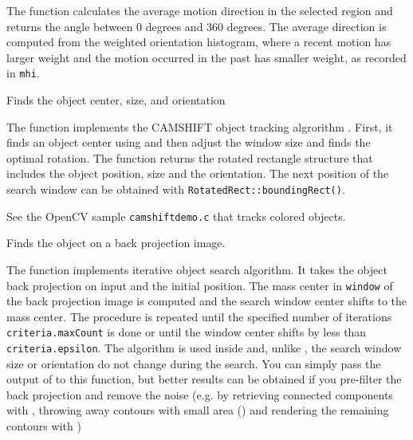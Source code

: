 The function calculates the average
motion direction in the selected region and returns the angle between
0 degrees  and 360 degrees. The average direction is computed from
the weighted orientation histogram, where a recent motion has larger
weight and the motion occurred in the past has smaller weight, as recorded in \texttt{mhi}.

Finds the object center, size, and orientation

\begin{description}
\end{description}

The function implements the CAMSHIFT object tracking algrorithm
.
First, it finds an object center using  and then adjust the window size and finds the optimal rotation. The function returns the rotated rectangle structure that includes the object position, size and the orientation. The next position of the search window can be obtained with \texttt{RotatedRect::boundingRect()}.

See the OpenCV sample \texttt{camshiftdemo.c} that tracks colored objects.

Finds the object on a back projection image.

\begin{description}
\end{description}

The function implements iterative object search algorithm. It takes the object back projection on input and the initial position. The mass center in \texttt{window} of the back projection image is computed and the search window center shifts to the mass center. The procedure is repeated until the specified number of iterations \texttt{criteria.maxCount} is done or until the window center shifts by less than \texttt{criteria.epsilon}. The algorithm is used inside  and, unlike , the search window size or orientation do not change during the search. You can simply pass the output of  to this function, but better results can be obtained if you pre-filter the back projection and remove the noise (e.g. by retrieving connected components with , throwing away contours with small area () and rendering the  remaining contours with )


